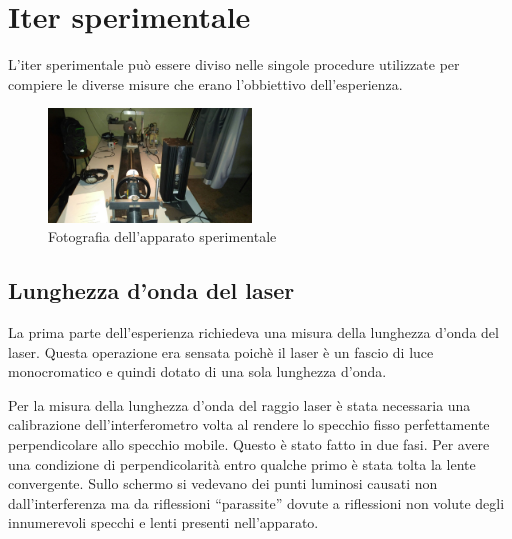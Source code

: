 \documentclass[a4paper,11pt]{article}
\newcommand{\virgolette}[1]{``#1''}
\begin{document}
	\section{Iter sperimentale}
	L'iter sperimentale può essere diviso nelle singole procedure utilizzate per compiere le diverse misure che erano l'obbiettivo dell'esperienza.
	
	\begin{figure}
		\vspace{-2.2cm}
		\caption{Fotografia dell'apparato sperimentale}
		\vspace{0.2cm}
		\centering
		\label{apparato}
		\includegraphics[width=0.48\textwidth]{apparato}
	\end{figure}
	
	\subsection{Lunghezza d'onda del laser}
	La prima parte dell'esperienza richiedeva una misura della lunghezza d'onda del laser. Questa operazione era sensata poichè il laser è un fascio di luce monocromatico e quindi dotato di una sola lunghezza d'onda.
	
	Per la misura della lunghezza d'onda del raggio laser è stata necessaria una calibrazione dell'interferometro volta al rendere lo specchio fisso perfettamente perpendicolare allo specchio mobile. Questo è stato fatto in due fasi. Per avere una condizione di perpendicolarità entro qualche primo è stata tolta la lente convergente. Sullo schermo si vedevano dei punti luminosi causati non dall'interferenza ma da riflessioni \virgolette{parassite} dovute a riflessioni non volute degli innumerevoli specchi e lenti presenti nell'apparato.
	
\end{document}
